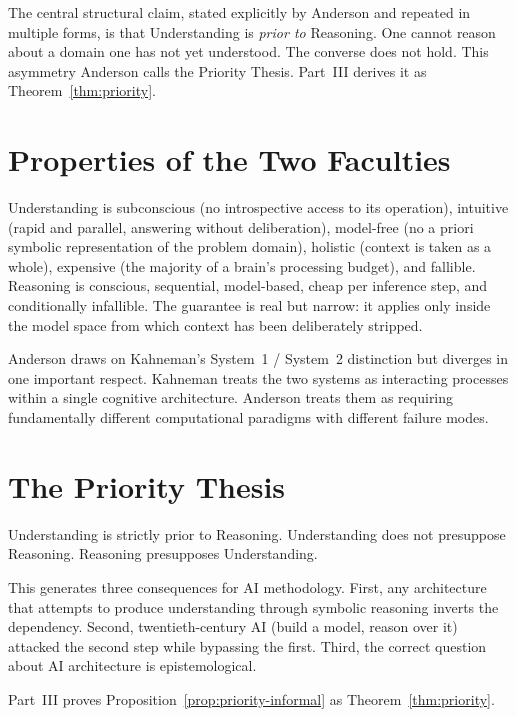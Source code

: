 \documentclass[12pt, a4paper, oneside]{book}
\begin{document}
The central structural claim, stated explicitly by Anderson and repeated
in multiple forms, is that Understanding is \emph{prior to} Reasoning.
One cannot reason about a domain one has not yet understood. The converse
does not hold. This asymmetry Anderson calls the Priority Thesis.
Part~III derives it as Theorem~\ref{thm:priority}.

\section{Properties of the Two Faculties}

Understanding is subconscious (no introspective access to its operation),
intuitive (rapid and parallel, answering without deliberation), model-free
(no a priori symbolic representation of the problem domain), holistic
(context is taken as a whole), expensive (the majority of a brain's
processing budget), and fallible. Reasoning is conscious, sequential,
model-based, cheap per inference step, and conditionally infallible.
The guarantee is real but narrow: it applies only inside the model space
from which context has been deliberately stripped.

Anderson draws on Kahneman's System~1 / System~2 distinction but diverges
in one important respect. Kahneman treats the two systems as interacting
processes within a single cognitive architecture. Anderson treats them as
requiring fundamentally different computational paradigms with different
failure modes.

\section{The Priority Thesis}

\begin{proposition}
\label{prop:priority-informal}
Understanding is strictly prior to Reasoning. Understanding does not
presuppose Reasoning. Reasoning presupposes Understanding.
\end{proposition}

This generates three consequences for AI methodology. First, any
architecture that attempts to produce understanding through symbolic
reasoning inverts the dependency. Second, twentieth-century AI (build a
model, reason over it) attacked the second step while bypassing the first.
Third, the correct question about AI architecture is epistemological.

Part~III proves Proposition~\ref{prop:priority-informal} as Theorem~\ref{thm:priority}.
\end{document}
